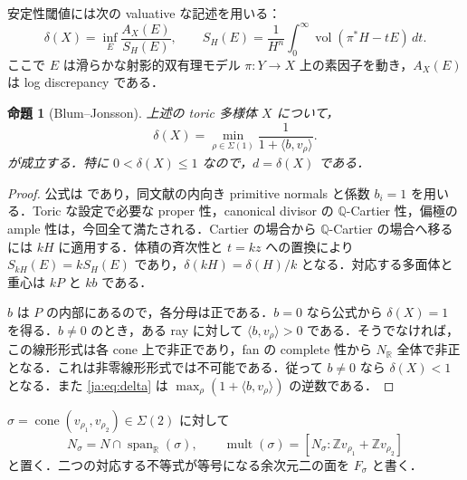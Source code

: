 \documentclass[12pt]{amsart}
\theoremstyle{definition}
\theoremstyle{remark}
\numberwithin{equation}{section}
\theoremstyle{plain}
\newtheorem{jprop}[thm]{命題}
\theoremstyle{definition}
\theoremstyle{remark}
\begin{document}
安定性閾値には次の valuative な記述を用いる：
\[
\delta(X)=\inf_E\frac{A_X(E)}{S_H(E)},\qquad
S_H(E)=\frac1{H^n}\int_0^\infty\operatorname{vol}(\pi^*H-tE)\,dt.
\]
ここで $E$ は滑らかな射影的双有理モデル $\pi:Y\to X$ 上の素因子を動き，$A_X(E)$ は log discrepancy である．

\begin{jprop}[Blum--Jonsson]\label{ja:prop:delta}
上述の toric 多様体 $X$ について，
\begin{equation}\label{ja:eq:delta}
 \delta(X)=\min_{\rho\in\Sigma(1)}
       \frac1{1+\langle b,v_\rho\rangle}.
\end{equation}
が成立する．特に $0<\delta(X)\le1$ なので，$d=\delta(X)$ である．
\end{jprop}
\begin{proof}
公式は \cite[Corollary~7.16 and \S7.6]{ja:BJ} であり，同文献の内向き primitive normals と係数 $b_i=1$ を用いる．Toric な設定で必要な proper 性，canonical divisor の $\mathbb Q$-Cartier 性，偏極の ample 性は，今回全て満たされる．Cartier の場合から $\mathbb Q$-Cartier の場合へ移るには $kH$ に適用する．体積の斉次性と $t=kz$ への置換により $S_{kH}(E)=kS_H(E)$ であり，$\delta(kH)=\delta(H)/k$ となる．対応する多面体と重心は $kP$ と $kb$ である．

$b$ は $P$ の内部にあるので，各分母は正である．$b=0$ なら公式から $\delta(X)=1$ を得る．$b\ne0$ のとき，ある ray に対して $\langle b,v_\rho\rangle>0$ である．そうでなければ，この線形形式は各 cone 上で非正であり，fan の complete 性から $N_{\mathbb R}$ 全体で非正となる．これは非零線形形式では不可能である．従って $b\ne0$ なら $\delta(X)<1$ となる．また \eqref{ja:eq:delta} は $\max_\rho(1+\langle b,v_\rho\rangle)$ の逆数である．
\end{proof}

$\sigma=\operatorname{cone}(v_{\rho_1},v_{\rho_2})\in\Sigma(2)$ に対して
\[
N_\sigma=N\cap\operatorname{span}_{\mathbb R}(\sigma),\qquad
\operatorname{mult}(\sigma)
=[N_\sigma:\mathbb Zv_{\rho_1}+\mathbb Zv_{\rho_2}]
\]
と置く．二つの対応する不等式が等号になる余次元二の面を $F_\sigma$ と書く．
\end{document}
